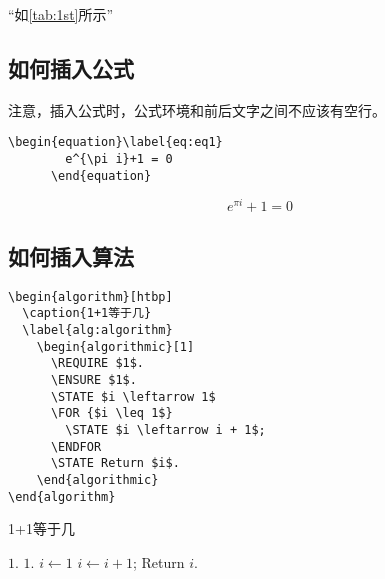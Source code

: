 “如\cref{tab:1st}所示”


\subsection{如何插入公式}

注意，插入公式时，公式环境和前后文字之间不应该有空行。

\begin{center}
  \begin{minipage}{0.85\textwidth}
    \begin{Verbatim}[frame=single]
      \begin{equation}\label{eq:eq1}
        e^{\pi i}+1 = 0
      \end{equation}
    \end{Verbatim}
  \end{minipage}
\end{center}

      \begin{equation}\label{eq:eq1}
        e^{\pi i}+1 = 0
      \end{equation}

\subsection{如何插入算法}

\begin{center}
  \begin{minipage}{0.85\textwidth}
    \begin{Verbatim}[frame=single]
\begin{algorithm}[htbp]
  \caption{1+1等于几}
  \label{alg:algorithm}
    \begin{algorithmic}[1]
      \REQUIRE $1$.
      \ENSURE $1$.
      \STATE $i \leftarrow 1$
      \FOR {$i \leq 1$}
        \STATE $i \leftarrow i + 1$;
      \ENDFOR
      \STATE Return $i$.
    \end{algorithmic}
\end{algorithm}
    \end{Verbatim}
  \end{minipage}
\end{center}

\begin{algorithm}[htbp]
\caption{1+1等于几}
\label{alg:algorithm}
\begin{algorithmic}[1]
\REQUIRE $1$.
\ENSURE $1$.
\STATE $i \leftarrow 1$
\STATE $i \leftarrow i + 1$;
\ENDFOR
\STATE Return $i$.
\end{algorithmic}
\end{algorithm}


